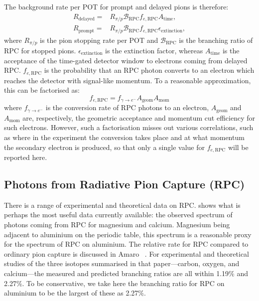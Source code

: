The background rate per \ac{POT} for prompt and delayed pions is therefore:
\begin{align}
	R_\textrm{delayed}=&R_{\pi/p}\mathcal{B}_\textrm{RPC}f_{e,\textrm{RPC}}A_\textrm{time}, \\
	R_\textrm{prompt}=&R_{\pi/p}\mathcal{B}_\textrm{RPC}f_{e,\textrm{RPC}}\epsilon_\textrm{extinction},
\end{align}
where $R_{\pi/p}$ is the pion stopping rate per \ac{POT} and $\mathcal{B}_\textrm{RPC}$ is the branching ratio of \ac{RPC} for stopped pions.
$\epsilon_\textrm{extinction}$ is the extinction factor, whereas $A_\textrm{time}$ is the acceptance of the time-gated detector window to electrons coming from delayed RPC.
$f_{e,\textrm{RPC}}$ is the probability that an RPC photon converts to an electron which reaches the detector with signal-like momentum.
To a reasonable approximation, this can be factorised as:
\begin{equation}
f_{e,\textrm{RPC}}=f_{\gamma\rightarrow{}e^-}A_\textrm{geom}A_\textrm{mom}
\end{equation}
where $f_{\gamma\rightarrow{}e^-}$ is the conversion rate of RPC photons to an electron, $A_\textrm{geom}$ and $A_\textrm{mom}$
are, respectively, the geometric acceptance and momentum cut efficiency for such electrons.
However, such a factorisation misses out various correlations, such as where in the experiment the conversion takes place and at what momentum the secondary electron is produced, so that only a single value for $f_{e,\textrm{RPC}}$ will be reported here.

\FigRPCData
\subsection{Photons from Radiative Pion Capture (\acs{RPC})}
There is a range of experimental and theoretical data on \ac{RPC}. 
 shows what is perhaps the most useful data currently available: the observed spectrum of photons coming from RPC for magnesium and calcium.
Magnesium being adjacent to aluminium on the periodic table, this spectrum is a reasonable proxy for the spectrum of \ac{RPC} on aluminium.
The relative rate for \ac{RPC} compared to ordinary pion capture is discussed in Amaro \etal~\cite{Amaro:1997ed}.
For experimental and theoretical studies of the three isotopes summarised in that paper---carbon, oxygen, and calcium---the measured and predicted branching ratios are all within 1.19\% and 2.27\%.
To be conservative, we take here the branching ratio for RPC on aluminium to be the largest of these as 2.27\%.


